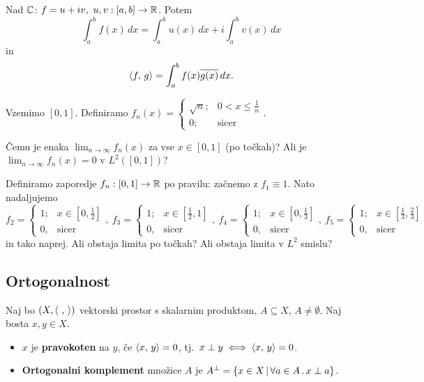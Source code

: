 \begin{opomba}
    Nad \(\mathbb{C}\): \(f = u + iv, \ u, v: [a, b] \to \mathbb{R}\). Potem 
    \[\int_{a}^{b}f(x) \, dx = \int_{a}^{b}u(x) \, dx + i\int_{a}^{b}v(x) \, dx \]
    in 
    \[\langle f, \, g \rangle = \int_{a}^{b}f(x) \overline{g(x)} \, dx.\]
\end{opomba}

\begin{zgled}
    Vzemimo \([0, 1]\). Definiramo \(f_n(x) = \begin{cases}
        \sqrt{n}; &0 < x \leq \frac{1}{n} \\ 0; &\text{sicer}
    \end{cases}.\)

    Čemu je enaka \(\lim_{n \to \infty} f_n(x)\) za vse \(x \in [0, 1]\) (po točkah)? Ali je \(\lim_{n \to \infty} f_n(x) = 0\) v \(L^2([0,1])\)?
\end{zgled}

\begin{zgled}
    Definiramo zaporedje \(f_n: [0, 1] \to \mathbb{R}\) po pravilu: začnemo z \(f_1 \equiv 1\). Nato nadaljujemo
    \[
    f_2 = \begin{cases}
            1; &x \in [0, \frac{1}{2}] \\ 0, &\text{sicer}
        \end{cases}, \ 
    f_3 = \begin{cases}
            1; &x \in [\frac{1}{2}, 1] \\ 0, &\text{sicer}
        \end{cases}, \ 
    f_4 = \begin{cases}
            1; &x \in [0, \frac{1}{3}] \\ 0, &\text{sicer}
        \end{cases}, \
    f_5 = \begin{cases}
            1; &x \in [\frac{1}{3}, \frac{2}{3}] \\ 0, &\text{sicer}
        \end{cases}
    \]
    in tako naprej. Ali obstaja limita po točkah? Ali obstaja limita v \(L^2\) smislu?
\end{zgled}

\subsection{Ortogonalnost}
\begin{definicija}
    Naj bo \((X, \langle \ , \,  \rangle)\) vektorski prostor s skalarnim produktom, \(A \subseteq X\), \(A \neq \emptyset\). Naj bosta \(x, y \in X\).
    \begin{itemize}
        \item \(x\) je \textbf{pravokoten} na \(y\), če \(\langle x, \, y \rangle = 0\), tj.\ \(x \perp y \iff \langle x, \, y \rangle = 0\).
        \item \textbf{Ortogonalni komplement} množice \(A\) je \(A^\perp = \{x \in X \,|\, \forall a \in A \,.\, x \perp a\}\).
    \end{itemize}
\end{definicija}

